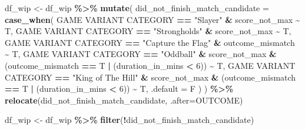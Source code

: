 \documentclass[
]{article}
\newenvironment{Shaded}{\begin{snugshade}}{\end{snugshade}}
\newcommand{\AttributeTok}[1]{\textcolor[rgb]{0.13,0.29,0.53}{#1}}
\newcommand{\DecValTok}[1]{\textcolor[rgb]{0.00,0.00,0.81}{#1}}
\newcommand{\FunctionTok}[1]{\textcolor[rgb]{0.13,0.29,0.53}{\textbf{#1}}}
\newcommand{\NormalTok}[1]{#1}
\newcommand{\OtherTok}[1]{\textcolor[rgb]{0.56,0.35,0.01}{#1}}
\newcommand{\SpecialCharTok}[1]{\textcolor[rgb]{0.81,0.36,0.00}{\textbf{#1}}}
\newcommand{\StringTok}[1]{\textcolor[rgb]{0.31,0.60,0.02}{#1}}
\begin{document}
\begin{Shaded}
\begin{Highlighting}[]
\NormalTok{df\_wip }\OtherTok{\textless{}{-}}\NormalTok{ df\_wip }\SpecialCharTok{\%\textgreater{}\%} \FunctionTok{mutate}\NormalTok{(}
  \AttributeTok{did\_not\_finish\_match\_candidate =} \FunctionTok{case\_when}\NormalTok{(}
    \StringTok{\textasciigrave{}}\AttributeTok{GAME VARIANT CATEGORY}\StringTok{\textasciigrave{}} \SpecialCharTok{==} \StringTok{"Slayer"} \SpecialCharTok{\&}\NormalTok{ score\_not\_max }\SpecialCharTok{\textasciitilde{}}\NormalTok{ T,}
    \StringTok{\textasciigrave{}}\AttributeTok{GAME VARIANT CATEGORY}\StringTok{\textasciigrave{}} \SpecialCharTok{==} \StringTok{"Strongholds"} \SpecialCharTok{\&}\NormalTok{ score\_not\_max }\SpecialCharTok{\textasciitilde{}}\NormalTok{ T,}
    \StringTok{\textasciigrave{}}\AttributeTok{GAME VARIANT CATEGORY}\StringTok{\textasciigrave{}} \SpecialCharTok{==} \StringTok{"Capture the Flag"} \SpecialCharTok{\&}\NormalTok{ outcome\_mismatch }\SpecialCharTok{\textasciitilde{}}\NormalTok{ T,}
    \StringTok{\textasciigrave{}}\AttributeTok{GAME VARIANT CATEGORY}\StringTok{\textasciigrave{}} \SpecialCharTok{==} \StringTok{"Oddball"} \SpecialCharTok{\&}\NormalTok{ score\_not\_max }\SpecialCharTok{\&} 
\NormalTok{      (outcome\_mismatch }\SpecialCharTok{==}\NormalTok{ T }\SpecialCharTok{|}\NormalTok{ (duration\_in\_mins }\SpecialCharTok{\textless{}} \DecValTok{6}\NormalTok{)) }\SpecialCharTok{\textasciitilde{}}\NormalTok{ T,}
    \StringTok{\textasciigrave{}}\AttributeTok{GAME VARIANT CATEGORY}\StringTok{\textasciigrave{}} \SpecialCharTok{==} \StringTok{"King of The Hill"} \SpecialCharTok{\&}\NormalTok{ score\_not\_max }\SpecialCharTok{\&}
\NormalTok{      (outcome\_mismatch }\SpecialCharTok{==}\NormalTok{ T }\SpecialCharTok{|}\NormalTok{ (duration\_in\_mins }\SpecialCharTok{\textless{}} \DecValTok{6}\NormalTok{)) }\SpecialCharTok{\textasciitilde{}}\NormalTok{ T,}
    \AttributeTok{.default =}\NormalTok{ F}
\NormalTok{  )}
\NormalTok{) }\SpecialCharTok{\%\textgreater{}\%}
  \FunctionTok{relocate}\NormalTok{(did\_not\_finish\_match\_candidate, }\AttributeTok{.after=}\NormalTok{OUTCOME)}

\NormalTok{df\_wip }\OtherTok{\textless{}{-}}\NormalTok{ df\_wip }\SpecialCharTok{\%\textgreater{}\%} \FunctionTok{filter}\NormalTok{(}\SpecialCharTok{!}\NormalTok{did\_not\_finish\_match\_candidate)}


\end{Highlighting}
\end{Shaded}
\end{document}
